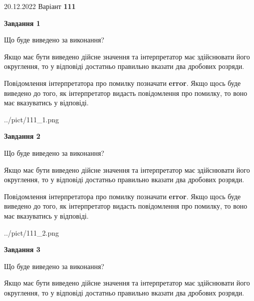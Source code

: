 \documentclass[12pt, ukrainian]{article}
\begin{document}
{20.12.2022 Варіант \No \textbf { 111 }\par}
{
\begin {Large}

{\begin {center}\textbf{Завдання 1}\end {center}}\par
Що буде виведено за виконання? \par

Якщо має бути виведено дійсне значення та інтерпретатор має здійснювати його округлення, 
то у відповіді достатньо правильно вказати два дробових розряди.

Повідомлення інтерпретатора про помилку позначати \textbf{error}.
Якщо щось буде виведено до того, як інтерпретатор видасть повідомлення про помилку, 
то воно має вказуватись у відповіді. \par

\begin{center}
	{../pict/111_1.png}
\end{center}
\newpage

{\begin {center}\textbf{Завдання 2}\end {center}}\par
Що буде виведено за виконання? \par

Якщо має бути виведено дійсне значення та інтерпретатор має здійснювати його округлення, 
то у відповіді достатньо правильно вказати два дробових розряди.

Повідомлення інтерпретатора про помилку позначати \textbf{error}.
Якщо щось буде виведено до того, як інтерпретатор видасть повідомлення про помилку, 
то воно має вказуватись у відповіді. \par

\begin{center}
	{../pict/111_2.png}
\end{center}
\newpage

{\begin {center}\textbf{Завдання 3}\end {center}}\par
Що буде виведено за виконання? \par

Якщо має бути виведено дійсне значення та інтерпретатор має здійснювати його округлення, 
то у відповіді достатньо правильно вказати два дробових розряди.


\end{Large}}
\end{document}
